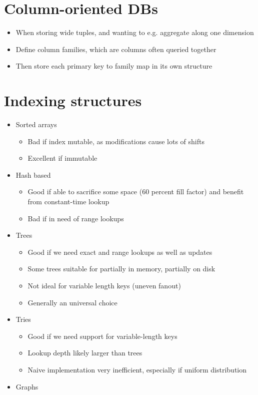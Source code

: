 \documentclass[a4paper]{scrreprt}
\begin{document}
\section{Column-oriented DBs}

\begin{itemize}
		\item When storing wide tuples, and wanting to e.g. aggregate along one dimension
		\item Define column families, which are columns often queried together
		\item Then store each primary key to family map in its own structure
\end{itemize}

\section{Indexing structures}

\begin{itemize}
		\item Sorted arrays
				\begin{itemize}
						\item Bad if index mutable, as modifications cause lots of shifts
						\item Excellent if immutable
				\end{itemize}
		\item Hash based
				\begin{itemize}
						\item Good if able to sacrifice some space (60 percent fill factor) and benefit from constant-time lookup
						\item Bad if in need of range lookups
				\end{itemize}
		\item Trees
				\begin{itemize}
						\item Good if we need exact and range lookups as well as updates
						\item Some trees suitable for partially in memory, partially on disk
						\item Not ideal for variable length keys (uneven fanout)
						\item Generally an universal choice
				\end{itemize}
		\item Tries
				\begin{itemize}
						\item Good if we need support for variable-length keys
						\item Lookup depth likely larger than trees
						\item Naive implementation very inefficient, especially if uniform distribution
				\end{itemize}
		\item Graphs
\end{itemize}
\end{document}
